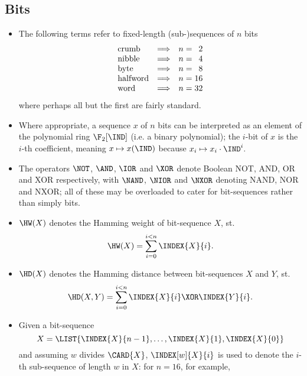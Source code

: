 
\subsection{Bits}

\begin{itemize}

\item The following terms refer to fixed-length (sub-)sequences of $n$ bits
      \[
      \begin{array}{lcc@{\;}c@{\;}r}
      \mbox{crumb}    &\Longrightarrow& n &=&  2 \\
      \mbox{nibble}   &\Longrightarrow& n &=&  4 \\
      \mbox{byte}     &\Longrightarrow& n &=&  8 \\
      \mbox{halfword} &\Longrightarrow& n &=& 16 \\
      \mbox    {word} &\Longrightarrow& n &=& 32 \\
      \end{array}
      \]
      where perhaps all but the first are fairly standard.
\item Where appropriate, a sequence $x$ of $n$ bits can be interpreted as an
      element of the polynomial ring $\F_2[\IND]$
      (i.e. a binary polynomial);
      the $i$-bit of $x$ is the $i$-th coefficient, meaning
      $
      x \mapsto x( \IND )
      $
      because
      $
      x_i \mapsto x_i \cdot \IND^i .
      $
\item The operators $\NOT$, $\AND$, $\IOR$ and $\XOR$ denote Boolean NOT, AND,
      OR and XOR respectively, with $\NAND$, $\NIOR$ and $\NXOR$ denoting NAND,
      NOR and NXOR; all of these may be overloaded to cater for bit-sequences
      rather than simply bits.
\item $\HW( X )$
      denotes the Hamming weight   of      bit-sequence  $X$,         st.
      \[
      \HW( X )    = \sum_{i=0}^{i<n} \INDEX{X}{i}                   .
      \]
\item $\HD( X )$
      denotes the Hamming distance between bit-sequences $X$ and $Y$, st.
      \[
      \HD( X, Y ) = \sum_{i=0}^{i<n} \INDEX{X}{i} \XOR \INDEX{Y}{i} .
      \]
\item Given a bit-sequence
      \[
      X = \LIST{ \INDEX{X}{n-1}, \ldots, \INDEX{X}{1}, \INDEX{X}{0} } 
      \]
      and assuming $w$ divides $\CARD{X}$, $\INDEX[w]{X}{i}$ is used to denote 
      the $i$-th sub-sequence of length $w$ in $X$: for $n = 16$, for example, 

\end{itemize}
